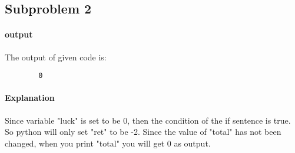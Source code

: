 \documentclass{article}
\theoremstyle{break}
\begin{document}
    \subsection{Subproblem 2}
    \paragraph{output}\par
    The output of given code is:
    \begin{lstlisting}
        0
    \end{lstlisting}
    \paragraph{Explanation}\par
    Since variable "luck" is set to be 0, then the condition of the if sentence is true. So python will only set "ret" to be -2. Since the value of "total" has not been changed, when you print "total" you will get 0 as output.
\end{document}
